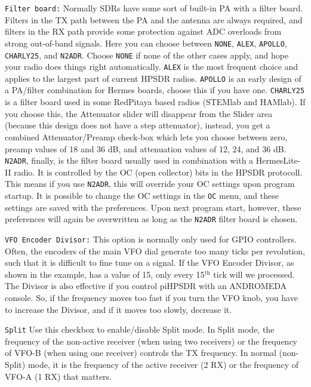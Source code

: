 \documentclass[12pt]{book}
\def\rett#1{\texttt{\color{red}#1}}
\def\bltt#1{\texttt{\color{blue}#1}}
\begin{document}
\rett{Filter board:} Normally SDRs have some sort of built-in PA with a filter board. Filters in the TX path
between the PA and the antenna are always required, and filters in the RX path provide some protection
against ADC overloads from strong out-of-band signals. Here you can choose between \texttt{NONE}, 
\texttt{ALEX},
\texttt{APOLLO}, \texttt{CHARLY25}, and \texttt{N2ADR}. Choose \texttt{NONE} if none of the other cases
apply, and hope your radio does things right automatically. \texttt{ALEX} is the most frequent choice
and applies to the largest part of current HPSDR radios. \texttt{APOLLO} is an early design of a
PA/filter combination for Hermes boards, choose this if you have one. \texttt{CHARLY25} is a filter board
used in some RedPitaya based radios (STEMlab and HAMlab). If you choose this, the Attenuator slider will
disappear from the Slider area (because this design does not have a step attenuator), instead, you get
a combined Attenuator/Preamp check-box which lets you choose between zero, preamp values of 18 and 36 dB,
and attenuation values of 12, 24, and 36 dB. \texttt{N2ADR}, finally, is the filter board usually used
in combination with a HermesLite-II radio. It is controlled by the OC (open collector) bits in the HPSDR
protocoll. This means if you use \texttt{N2ADR}, this will override your OC settings upon program startup.
It is possible to change the OC settings in the \bltt{OC} menu, and these settings are saved with the
preferences. Upon next program start, however, these preferences will again be overwritten as long
as the \texttt{N2ADR} filter board is chosen.

\rett{VFO Encoder Divisor:} This option is normally only used for GPIO controllers. Often, the 
encoders of the main VFO dial generate too many ticks per revolution, such that it is difficult
to fine tune on a signal. If the VFO Encoder Divisor, as shown in the example, has a value of
15, only every 15$^\textrm{th}$ tick will we processed. The Divisor is also effective if you
control piHPSDR with an ANDROMEDA console. So, if the frequency moves too fast if you turn
the VFO knob, you have to increase the Divisor, and if it moves too slowly, decrease it.

\rett{Split} Use this checkbox to enable/disable Split mode. In Split mode, the frequency of
the non-active receiver (when using two receivers) or the frequency of VFO-B (when using one
receiver) controls the TX frequency. In normal (non-Split) mode, it is the frequency of
the active receiver (2 RX) or the frequency of VFO-A (1 RX) that matters.
\end{document}

